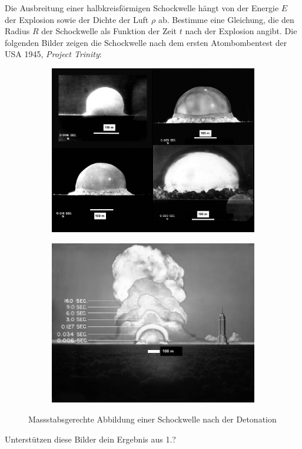 \begin{Exercise}[label = trinity, origin = Aaron Wild, title = {Project Trinity}, difficulty = 3]
	\hspace{0.02pt}
	Die Ausbreitung einer halbkreisförmigen Schockwelle hängt von der Energie $E$ der Explosion sowie der Dichte der Luft $\rho$ ab.
	\Question Bestimme eine Gleichung, die den Radius $R$ der Schockwelle als Funktion der Zeit $t$ nach der Explosion angibt.
	\ExeText Die folgenden Bilder zeigen die Schockwelle nach dem ersten Atombombentest der USA 1945, \textit{Project Trinity}:
		\begin{figure}[h]
		\begin{subfigure}[b]{0.5\textwidth}
			\centering
			\includegraphics[scale = 0.2]{../tasks/selfmade/trinityim.jpeg}
		\end{subfigure}
		\begin{subfigure}[b]{0.5\textwidth}
			\centering
			\includegraphics[scale = 0.25]{../tasks/selfmade/trinityim2.png}
		\end{subfigure}
		\caption{Massstabsgerechte Abbildung einer Schockwelle nach der Detonation}
		\label{fig:trinityim}
		\end{figure}
	\Question Unterstützen diese Bilder dein Ergebnis aus 1.?
\end{Exercise}
